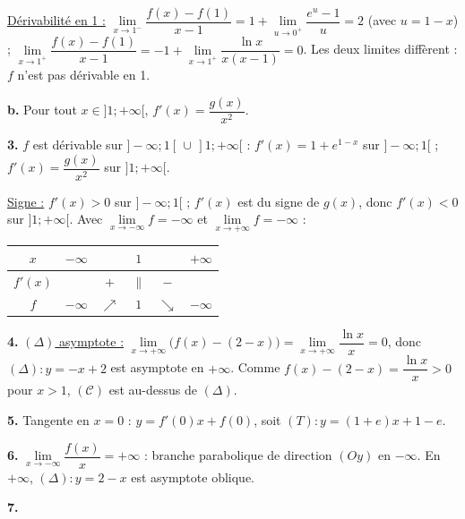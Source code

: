 \documentclass[11pt]{article}
\begin{document}
\underline{Dérivabilité en 1 :} $\lim\limits_{x\to 1^-}\dfrac{f(x) - f(1)}{x - 1} = 1 + \lim\limits_{u\to 0^+}\dfrac{e^u - 1}{u} = 2$ (avec $u = 1 - x$) ; $\lim\limits_{x\to 1^+}\dfrac{f(x) - f(1)}{x - 1} = -1 + \lim\limits_{x\to 1^+}\dfrac{\ln x}{x(x-1)} = 0$. Les deux limites diffèrent : $f$ n'est pas dérivable en 1.

\textbf{b.} Pour tout $x \in ]1;+\infty[$, $f'(x) = \dfrac{g(x)}{x^2}$.

\textbf{3.} $f$ est dérivable sur $]-\infty;1[\,\cup\,]1;+\infty[$ : $f'(x) = 1 + e^{1-x}$ sur $]-\infty;1[$ ; $f'(x) = \dfrac{g(x)}{x^2}$ sur $]1;+\infty[$.

\underline{Signe :} $f'(x) > 0$ sur $]-\infty;1[$ ; $f'(x)$ est du signe de $g(x)$, donc $f'(x) < 0$ sur $]1;+\infty[$. Avec $\lim\limits_{x\to-\infty} f = -\infty$ et $\lim\limits_{x\to+\infty} f = -\infty$ :
\begin{center}\renewcommand{\arraystretch}{1.4}
\begin{tabular}{|c|ccccc|}
\hline $x$ & $-\infty$ & & $1$ & & $+\infty$ \\\hline $f'(x)$ & & $+$ & $\|$ & $-$ & \\\hline $f$ & $-\infty$ & $\nearrow$ & $1$ & $\searrow$ & $-\infty$ \\\hline
\end{tabular}
\end{center}

\textbf{4.} \underline{$(\Delta)$ asymptote :} $\lim\limits_{x\to+\infty}\big(f(x) - (2 - x)\big) = \lim\limits_{x\to+\infty}\dfrac{\ln x}{x} = 0$, donc $(\Delta) : y = -x + 2$ est asymptote en $+\infty$. Comme $f(x) - (2-x) = \dfrac{\ln x}{x} > 0$ pour $x > 1$, $(\mathcal{C})$ est au-dessus de $(\Delta)$.

\textbf{5.} Tangente en $x = 0$ : $y = f'(0)x + f(0)$, soit $(T) : y = (1 + e)x + 1 - e$.

\textbf{6.} $\lim\limits_{x\to-\infty}\dfrac{f(x)}{x} = +\infty$ : branche parabolique de direction $(Oy)$ en $-\infty$. En $+\infty$, $(\Delta) : y = 2 - x$ est asymptote oblique.

\textbf{7.}
\begin{center}
\end{center}
\end{document}
